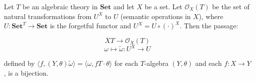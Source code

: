Let $T$ be an algebraic theory in $\mathbf{Set}$ and let $X$ be a set. Let $\mathcal{O}_X(T)$ be the set of natural transformations from $U^X$ to $U$ (semantic operations in $X$), where $U: \mathbf{Set}^T \longrightarrow \mathbf{Set}$ is the forgetful functor and $U^X = U \circ (\cdot)^X$. Then the passage:

$$XT \longrightarrow \mathcal{O}_X(T)$$
$$\omega \longmapsto \tilde{\omega}: U^X \longrightarrow U$$

defined by $\langle f, (Y, \theta)\tilde{\omega} \rangle = \langle \omega, fT \cdot \theta \rangle$ for each $T$-algebra $(Y, \theta)$ and each $f: X \longrightarrow Y$, is a bijection.
